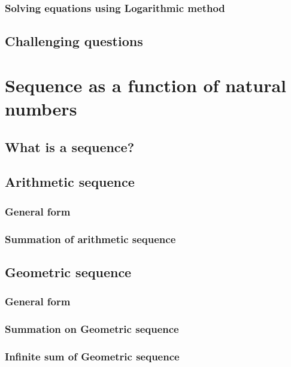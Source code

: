 \documentclass[12pt]{article}
\begin{document}
    \subsubsection*{Solving equations using Logarithmic method}

    \subsection{Challenging questions}

    \newpage

    \section{Sequence as a function of natural numbers}

    \subsection{What is a sequence?}

    \subsection{Arithmetic sequence}

    \subsubsection*{General form}

    \subsubsection*{Summation of arithmetic sequence}

    \subsection{Geometric sequence}

    \subsubsection*{General form}

    \subsubsection*{Summation on Geometric sequence}

    \subsubsection*{Infinite sum of Geometric sequence}
\end{document}
